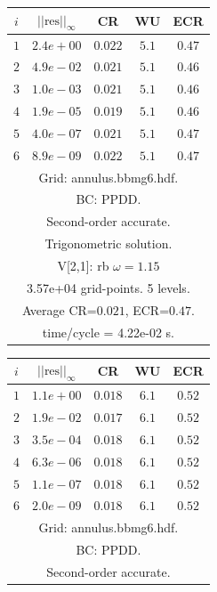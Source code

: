 \begin{table}[hbt]
\begin{center}
{%
\begin{tabular}{|c|c|c|c|c|} \hline 
 $i$   & $\vert\vert\mbox{res}\vert\vert_\infty$  &  CR     &  WU    & ECR  \\   \hline 
 $ 1$  & $ 2.4e+00$ & $0.022$ & $ 5.1$ & $0.47$ \\ 
 $ 2$  & $ 4.9e-02$ & $0.021$ & $ 5.1$ & $0.46$ \\ 
 $ 3$  & $ 1.0e-03$ & $0.021$ & $ 5.1$ & $0.46$ \\ 
 $ 4$  & $ 1.9e-05$ & $0.019$ & $ 5.1$ & $0.46$ \\ 
 $ 5$  & $ 4.0e-07$ & $0.021$ & $ 5.1$ & $0.47$ \\ 
 $ 6$  & $ 8.9e-09$ & $0.022$ & $ 5.1$ & $0.47$ \\ 
\hline 
\multicolumn{5}{|c|}{Grid: annulus.bbmg6.hdf.}  \\
\multicolumn{5}{|c|}{BC: PPDD.}  \\
\multicolumn{5}{|c|}{Second-order accurate.}  \\
\multicolumn{5}{|c|}{Trigonometric solution.}  \\
\multicolumn{5}{|c|}{V[2,1]: rb $\omega=1.15$}  \\
\multicolumn{5}{|c|}{3.57e+04 grid-points. 5 levels.}  \\
\multicolumn{5}{|c|}{Average CR=$0.021$, ECR=$0.47$.}  \\
\multicolumn{5}{|c|}{time/cycle = 4.22e-02 s.}  \\
\hline 
\end{tabular}
\begin{tabular}{|c|c|c|c|c|} \hline 
 $i$   & $\vert\vert\mbox{res}\vert\vert_\infty$  &  CR     &  WU    & ECR  \\   \hline 
 $ 1$  & $ 1.1e+00$ & $0.018$ & $ 6.1$ & $0.52$ \\ 
 $ 2$  & $ 1.9e-02$ & $0.017$ & $ 6.1$ & $0.52$ \\ 
 $ 3$  & $ 3.5e-04$ & $0.018$ & $ 6.1$ & $0.52$ \\ 
 $ 4$  & $ 6.3e-06$ & $0.018$ & $ 6.1$ & $0.52$ \\ 
 $ 5$  & $ 1.1e-07$ & $0.018$ & $ 6.1$ & $0.52$ \\ 
 $ 6$  & $ 2.0e-09$ & $0.018$ & $ 6.1$ & $0.52$ \\ 
\hline 
\multicolumn{5}{|c|}{Grid: annulus.bbmg6.hdf.}  \\
\multicolumn{5}{|c|}{BC: PPDD.}  \\
\multicolumn{5}{|c|}{Second-order accurate.}  \\

\end{tabular}}
\end{center}
\end{table}
